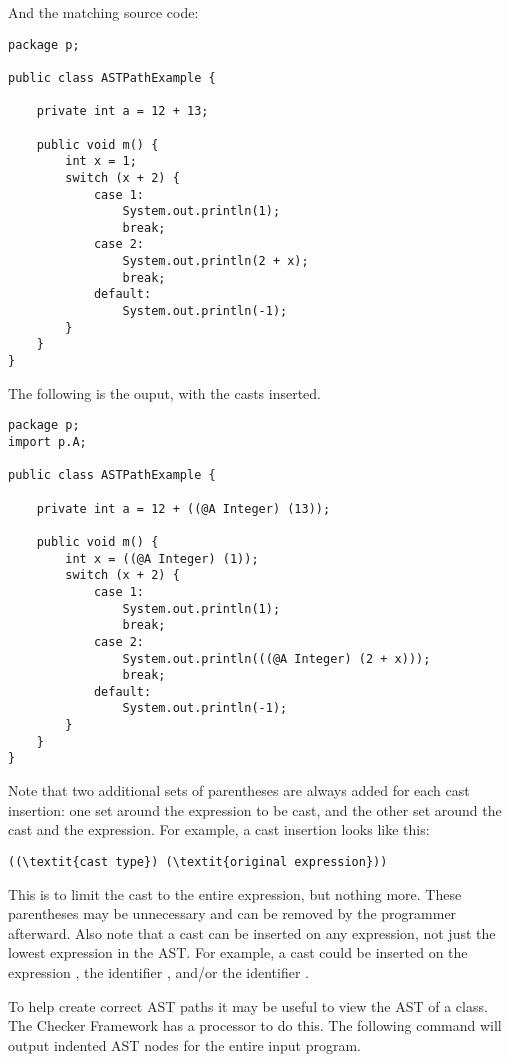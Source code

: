 \documentclass{article}
\newcommand{\code}[1]{\ifmmode{\mbox{\smaller\ttfamily{#1}}}\else{\smaller\ttfamily #1}\fi}
\begin{document}
And the matching source code:

\begin{verbatim}
package p;

public class ASTPathExample {

    private int a = 12 + 13;

    public void m() {
        int x = 1;
        switch (x + 2) {
            case 1:
                System.out.println(1);
                break;
            case 2:
                System.out.println(2 + x);
                break;
            default:
                System.out.println(-1);
        }
    }
}
\end{verbatim}

The following is the ouput, with the casts inserted.

\begin{verbatim}
package p;
import p.A;

public class ASTPathExample {

    private int a = 12 + ((@A Integer) (13));

    public void m() {
        int x = ((@A Integer) (1));
        switch (x + 2) {
            case 1:
                System.out.println(1);
                break;
            case 2:
                System.out.println(((@A Integer) (2 + x)));
                break;
            default:
                System.out.println(-1);
        }
    }
}
\end{verbatim}

Note that two additional sets of parentheses are always added for each cast
insertion: one set around the expression to be cast, and the other set around the
cast and the expression. For example, a cast insertion looks like this:

\begin{Verbatim}[commandchars=\\\{\}]
((\textit{cast type}) (\textit{original expression}))
\end{Verbatim}

This is to limit the cast to the entire expression, but
nothing more. These parentheses may be unnecessary and can be removed by the
programmer afterward. Also note that a cast can be inserted on any expression, not
just the lowest expression in the AST. For example, a cast could be inserted on
the expression \code{i + j}, the identifier \code{i}, and/or the identifier \code{j}.

To help create correct AST paths it may be useful to view the AST of a class.
The Checker Framework has a processor to do this. The following command will
output indented AST nodes for the entire input program.
\end{document}
